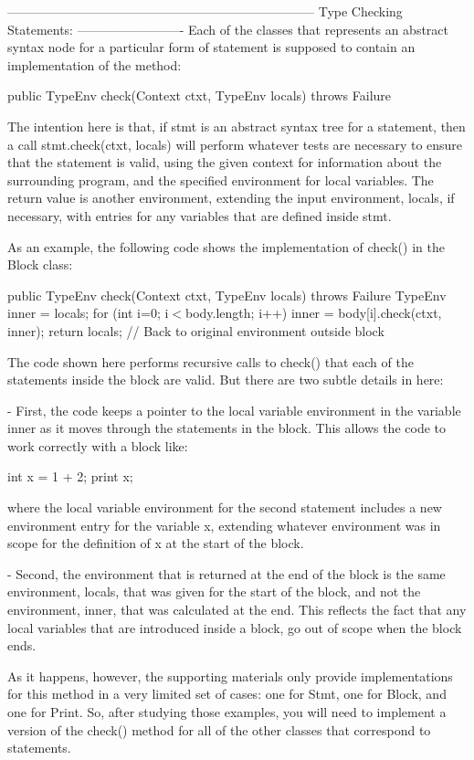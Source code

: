 \documentclass{article}
\begin{document}
------------------------------------------------------------------------
Type Checking Statements:
-------------------------
Each of the classes that represents an abstract syntax node for a
particular form of statement is supposed to contain an implementation
of the method:

    public TypeEnv check(Context ctxt, TypeEnv locals)
        throws Failure 

The intention here is that, if stmt is an abstract syntax tree for a
statement, then a call stmt.check(ctxt, locals) will perform whatever
tests are necessary to ensure that the statement is valid, using the
given context for information about the surrounding program, and the
specified environment for local variables.  The return value is another
environment, extending the input environment, locals, if necessary,
with entries for any variables that are defined inside stmt.

As an example, the following code shows the implementation of check()
in the Block class:

    public TypeEnv check(Context ctxt, TypeEnv locals)
      throws Failure {
        TypeEnv inner = locals; 
        for (int i=0; i$<$body.length; i++) {
            inner = body[i].check(ctxt, inner);
        }
        return locals;  // Back to original environment outside block
    }

The code shown here performs recursive calls to check() that each of
the statements inside the block are valid.  But there are two subtle
details in here:

- First, the code keeps a pointer to the local variable environment in
  the variable inner as it moves through the statements in the block.
  This allows the code to work correctly with a block like:

    { int x = 1 + 2; print x; }

  where the local variable environment for the second statement
  includes a new environment entry for the variable x, extending
  whatever environment was in scope for the definition of x at the
  start of the block.

- Second, the environment that is returned at the end of the block
  is the same environment, locals, that was given for the start of the
  block, and not the environment, inner, that was calculated at the
  end.  This reflects the fact that any local variables that are
  introduced inside a block, go out of scope when the block ends.

As it happens, however, the supporting materials only provide
implementations for this method in a very limited set of cases: one
for Stmt, one for Block, and one for Print.  So, after studying those
examples, you will need to implement a version of the check() method
for all of the other classes that correspond to statements.
\end{document}
